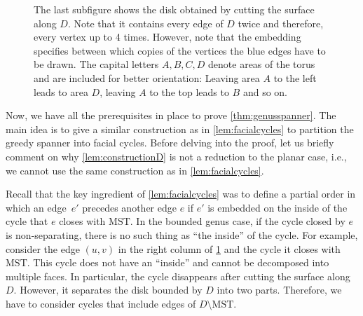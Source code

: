 \documentclass[a4paper,cleveref, autoref, thm-restate, thm-restate, UKenglish]{lipics-v2021}
\newcommand{\mst}{\mathrm{MST}}
\begin{document}
\begin{figure}[h]
{The last subfigure shows the disk obtained by cutting the surface along $D$. Note that it contains every edge of $D$ twice and therefore, every vertex up to 4 times. However, note that the embedding specifies between which copies of the vertices the blue edges have to be drawn.  The capital letters $A,B,C,D$ denote areas of the torus and are included for better orientation: Leaving area $A$ to the left leads to area $D$, leaving $A$ to the top leads to $B$ and so on.  } \label{fig:construction}
\end{figure}

Now, we have all the prerequisites in place to prove \cref{thm:genusspanner}. 
The main idea is to give a similar construction as in \cref{lem:facialcycles} to partition the greedy spanner into facial cycles. Before delving into the proof, let us briefly comment on why \cref{lem:constructionD} is not a reduction to the planar case, i.e., we cannot use the same construction as in \cref{lem:facialcycles}.

Recall that the key ingredient of \cref{lem:facialcycles} was to define a partial order in which an edge~$e'$ precedes another edge $e$ if $e'$ is embedded on the inside of the cycle that $e$ closes with $\mst$. In the bounded genus case, if the cycle closed by $e$ is non-separating, there is no such thing as ``the inside'' of the cycle. For example, consider the edge $(u,v)$ in the right column of \cref{fig:construction} and the cycle it closes with $\mst$. This cycle does not have an ``inside'' and cannot be decomposed into multiple faces. In particular, the cycle disappears after cutting the surface along $D$. However, it separates the disk bounded by $D$ into two parts. Therefore, we  have to consider cycles that include edges of $D \setminus \mst$.
\end{document}
